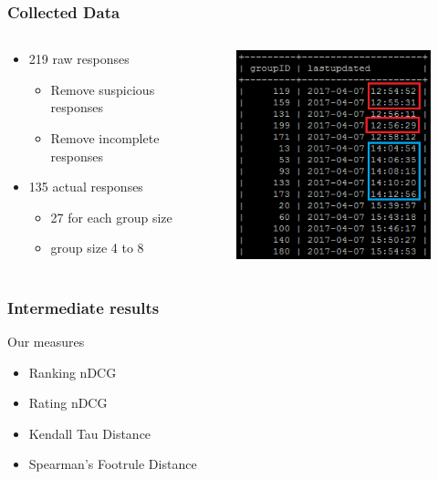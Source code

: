 \begin{frame}
\frametitle{Collected Data}
\begin{columns}
	\begin{column}{0.5\textwidth}
		\begin{itemize}
			\item 219 raw responses
			\begin{itemize}
				\item Remove suspicious responses
				\item Remove incomplete responses
			\end{itemize}
			\item 135 actual responses
			\begin{itemize}
				\item 27 for each group size
				\item group size 4 to 8
			\end{itemize}
		\end{itemize}
	\end{column}
	\begin{column}{0.5\textwidth}
		\begin{figure}
			\centering
			\includegraphics[scale=.5]{graphics/survey_lastupdated.png}
		\end{figure}
	\end{column}
\end{columns}
\end{frame}

\begin{frame}
\frametitle{Intermediate results}
Our measures
\begin{itemize}
	\item Ranking nDCG
	\item Rating nDCG
	\item Kendall Tau Distance
	\item Spearman's Footrule Distance
\end{itemize}
\end{frame}


